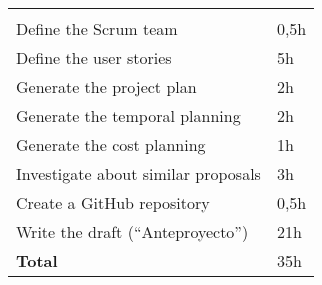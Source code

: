 \begin{tabular}{|p{}P{.1\textwidth}|}
	\hline
	 \\
	\hline
	\hline
	 			&  \\
	\hline
	Define the Scrum team					& 0,5h \\
	\hline
	Define the user stories					& 5h \\
	\hline
	Generate the project plan				& 2h \\
	\hline
	Generate the temporal planning			& 2h \\
	\hline
	Generate the cost planning				& 1h \\
	\hline
	Investigate about similar proposals								& 3h \\
	\hline
	Create a GitHub repository				& 0,5h \\
	\hline
	Write the draft (“Anteproyecto”)		& 21h \\
	\hline
	\textbf{Total} 							& 35h \\
	\hline

\end{tabular}